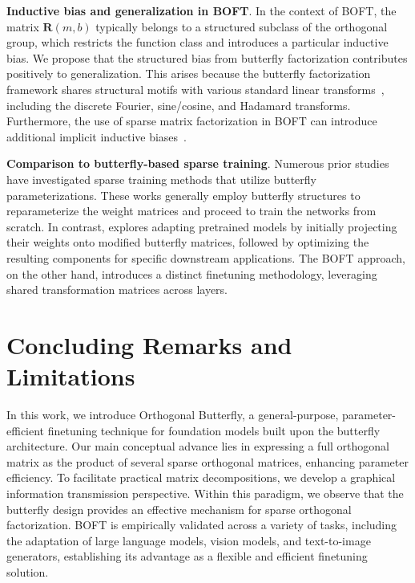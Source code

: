 \textbf{Inductive bias and generalization in BOFT}. In the context of BOFT, the matrix $\bm{R}(m,b)$ typically belongs to a structured subclass of the orthogonal group, which restricts the function class and introduces a particular inductive bias. We propose that the structured bias from butterfly factorization contributes positively to generalization. This arises because the butterfly factorization framework shares structural motifs with various standard linear transforms~\cite{dao2019kaleidoscope}, including the discrete Fourier, sine/cosine, and Hadamard transforms. Furthermore, the use of sparse matrix factorization in BOFT can introduce additional implicit inductive biases~\cite{gunasekar2017implicit,li2018algorithmic,liu2019neural}.

\textbf{Comparison to butterfly-based sparse training}. Numerous prior studies~\cite{dao2019learning,dao2019kaleidoscope,chen2022pixelated,dao2022monarch} have investigated sparse training methods that utilize butterfly parameterizations. These works generally employ butterfly structures to reparameterize the weight matrices and proceed to train the networks from scratch. In contrast, \cite{dao2022monarch} explores adapting pretrained models by initially projecting their weights onto modified butterfly matrices, followed by optimizing the resulting components for specific downstream applications. The BOFT approach, on the other hand, introduces a distinct finetuning methodology, leveraging shared transformation matrices across layers.



\section{Concluding Remarks and Limitations}

In this work, we introduce Orthogonal Butterfly, a general-purpose, parameter-efficient finetuning technique for foundation models built upon the butterfly architecture. Our main conceptual advance lies in expressing a full orthogonal matrix as the product of several sparse orthogonal matrices, enhancing parameter efficiency. To facilitate practical matrix decompositions, we develop a graphical information transmission perspective. Within this paradigm, we observe that the butterfly design provides an effective mechanism for sparse orthogonal factorization. BOFT is empirically validated across a variety of tasks, including the adaptation of large language models, vision models, and text-to-image generators, establishing its advantage as a flexible and efficient finetuning solution.


